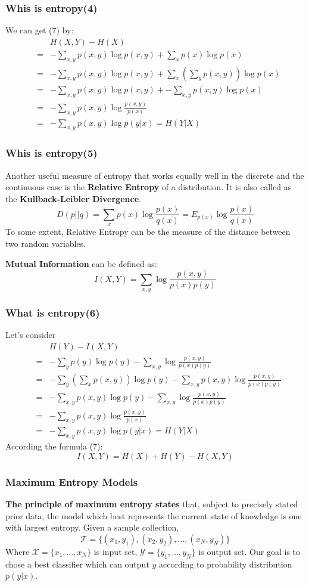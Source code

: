\documentclass[slidestop,compress,mathserif]{beamer}
\begin{document}
	\begin{frame}[shrink]	
		\frametitle{Whis is entropy(4)}
		We can get (7) by:
		\begin{eqnarray*}
			&& H(X,Y)-H(X) \\
			&=& -\sum_{x,y}p(x,y)\log p(x,y) + \sum_x p(x)\log p(x)\\
			&=& -\sum_{x,y}p(x,y)\log p(x,y) + \sum_x\left(\sum_y p(x,y)\right)\log p(x)\\
			&=& -\sum_{x,y}p(x,y)\log p(x,y)+ -\sum_{x,y}p(x,y)\log p(x)\\
			&=& -\sum_{x,y}p(x,y)\log\frac{p(x,y)}{p(x)}\\
			&=& -\sum_{x,y} p(x,y)\log p(y|x) = H(Y|X)
		\end{eqnarray*}

	\end{frame}
	
	\begin{frame}
		\frametitle{Whis is entropy(5)}
		Another useful measure of entropy that works equally well in the discrete and the continuous case is the \textbf{Relative Entropy} of a distribution. It is also called as the \textbf{Kullback-Leibler Divergence}.
		$$D(p||q) = \sum_x p(x)\log \frac{p(x)}{q(x)} = E_{p(x)}\log\frac{p(x)}{q(x)}$$
		To some extent, Relative Entropy can be the measure of the distance between two random variables.
		
		\textbf{Mutual Information} can be defined as:
		$$I(X,Y)=\sum_{x,y}\log\frac{p(x,y)}{p(x)p(y)}$$
	\end{frame}
	
	\begin{frame}[shrink]
		\frametitle{What is entropy(6)}
		Let's consider
		\begin{eqnarray*}
			&& H(Y)-I(X,Y)  \\
			&=& -\sum_y p(y)\log p(y) - \sum_{x,y}\log\frac{p(x,y)}{p(x)p(y)} \\
			&=& -\sum_y\left(\sum_x p(x,y)\right)\log p(y) - \sum_{x,y}p(x,y)\log\frac{p(x,y)}{p(x)p(y)} \\
			&=& -\sum_{x,y}p(x,y)\log p(y) - \sum_{x,y}\log\frac{p(x,y)}{p(x)p(y)} \\
			&=& -\sum_{x,y}p(x,y)\log\frac{p(x,y)}{p(x)} \\
			&=& -\sum_{x,y}p(x,y)\log p(y|x) = H(Y|X)
		\end{eqnarray*}
		According the formula (7):
		$$I(X,Y) = H(X)+H(Y)-H(X,Y)$$
	\end{frame}
	
	\begin{frame}
		\frametitle{Maximum Entropy Models}
		\textbf{The principle of maximum entropy states} that, subject to precisely stated prior data, the model which best represents the current state of knowledge is one with largest entropy.
		Given a sample collection, $$\mathcal{T}=\{(x_1,y_1),(x_2,y_2),\ldots,(x_N,y_N)\}$$
		Where $\mathcal{X}=\{x_1,\ldots,x_N\}$ is input set, $\mathcal{Y}=\{y_1,\ldots,y_N\}$ is output set. Our goal is to chose a best classifier which can output $y$ according to probability distribution $p(y|x)$.
		
	\end{frame}
	
\end{document}
